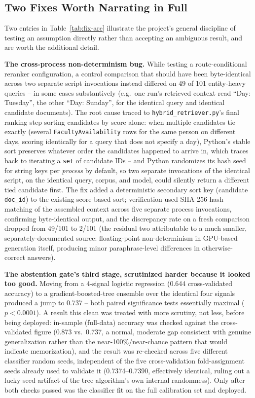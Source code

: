 \documentclass[a4paper,twoside]{article}
\begin{document}
\subsection{Two Fixes Worth Narrating in Full}
\label{subsec:fix-narratives}

Two entries in Table~\ref{tab:fix-arc} illustrate the project's general discipline of testing an assumption directly rather than accepting an ambiguous result, and are worth the additional detail.

\textbf{The cross-process non-determinism bug.} While testing a route-conditional reranker configuration, a control comparison that should have been byte-identical across two separate script invocations instead differed on 49 of 101 entity-heavy queries -- in some cases substantively (e.g.\ one run's retrieved context read ``Day: Tuesday'', the other ``Day: Sunday'', for the identical query and identical candidate documents). The root cause traced to \texttt{hybrid\_retriever.py}'s final ranking step sorting candidates by score alone: when multiple candidates tie exactly (several \texttt{FacultyAvailability} rows for the same person on different days, scoring identically for a query that does not specify a day), Python's stable sort preserves whatever order the candidates happened to arrive in, which traces back to iterating a \texttt{set} of candidate IDs -- and Python randomizes its hash seed for string keys per \emph{process} by default, so two separate invocations of the identical script, on the identical query, corpus, and model, could silently return a different tied candidate first. The fix added a deterministic secondary sort key (candidate \texttt{doc\_id}) to the existing score-based sort; verification used SHA-256 hash matching of the assembled context across five separate process invocations, confirming byte-identical output, and the discrepancy rate on a fresh comparison dropped from 49/101 to 2/101 (the residual two attributable to a much smaller, separately-documented source: floating-point non-determinism in GPU-based generation itself, producing minor paraphrase-level differences in otherwise-correct answers).

\textbf{The abstention gate's third stage, scrutinized harder because it looked too good.} Moving from a 4-signal logistic regression (0.644 cross-validated accuracy) to a gradient-boosted-tree ensemble over the identical four signals produced a jump to 0.737 -- both paired significance tests essentially maximal ($p<0.0001$). A result this clean was treated with more scrutiny, not less, before being deployed: in-sample (full-data) accuracy was checked against the cross-validated figure (0.873 vs.\ 0.737, a normal, moderate gap consistent with genuine generalization rather than the near-100\%/near-chance pattern that would indicate memorization), and the result was re-checked across five different classifier random seeds, independent of the five cross-validation fold-assignment seeds already used to validate it (0.7374--0.7390, effectively identical, ruling out a lucky-seed artifact of the tree algorithm's own internal randomness). Only after both checks passed was the classifier fit on the full calibration set and deployed.
\end{document}
